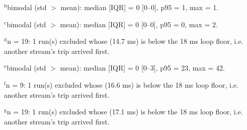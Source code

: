 \par\smallskip\footnotesize $^{\mathrm{b}}$bimodal (std $>$ mean): median [IQR] = 0 [0--0], p95 = 1, max = 1.
\par\smallskip\footnotesize $^{\mathrm{c}}$bimodal (std $>$ mean): median [IQR] = 0 [0--0], p95 = 0, max = 2.
\par\smallskip\footnotesize $^{\mathrm{d}}$n = 19: 1 run(s) excluded whose \ttrip{} (14.7 ms) is below the 18 ms loop floor, i.e. another stream's trip arrived first.
\par\smallskip\footnotesize $^{\mathrm{e}}$bimodal (std $>$ mean): median [IQR] = 0 [0--3], p95 = 23, max = 42.
\par\smallskip\footnotesize $^{\mathrm{f}}$n = 9: 1 run(s) excluded whose \ttrip{} (16.6 ms) is below the 18 ms loop floor, i.e. another stream's trip arrived first.
\par\smallskip\footnotesize $^{\mathrm{g}}$n = 19: 1 run(s) excluded whose \ttrip{} (17.1 ms) is below the 18 ms loop floor, i.e. another stream's trip arrived first.
